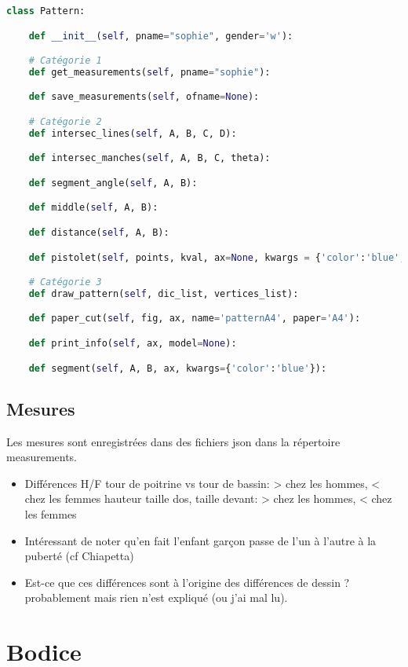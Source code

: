\documentclass[11pt,a4paper]{report}
\begin{document}
\begin{lstlisting}[language=python]
class Pattern:

	def __init__(self, pname="sophie", gender='w'):

	# Catégorie 1
	def get_measurements(self, pname="sophie"):

	def save_measurements(self, ofname=None):

	# Catégorie 2
	def intersec_lines(self, A, B, C, D):

	def intersec_manches(self, A, B, C, theta):

	def segment_angle(self, A, B):

	def middle(self, A, B):

	def distance(self, A, B):

	def pistolet(self, points, kval, ax=None, kwargs = {'color':'blue','linestyle':'solid'}, tot=False):

	# Catégorie 3
	def draw_pattern(self, dic_list, vertices_list):

	def paper_cut(self, fig, ax, name='patternA4', paper='A4'):

	def print_info(self, ax, model=None):

	def segment(self, A, B, ax, kwargs={'color':'blue'}):

\end{lstlisting}

\section{Mesures}

Les mesures sont enregistrées dans des fichiers json dans la répertoire measurements.

\begin{itemize}

\item Différences H/F
\subitem tour de poitrine vs tour de bassin: > chez les hommes, < chez les femmes
\subitem hauteur taille dos, taille devant: > chez les hommes, < chez les femmes

\item Intéressant de noter qu'en fait l'enfant garçon passe de l'un à l'autre à la puberté (cf Chiapetta)

\item Est-ce que ces différences sont à l'origine des différences de dessin ? probablement mais rien n'est expliqué (ou j'ai mal lu).
\end{itemize}


\chapter{Bodice}
\end{document}
